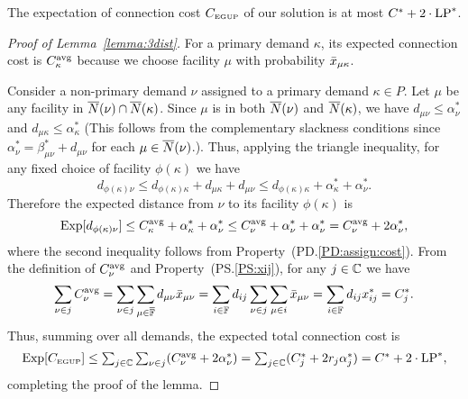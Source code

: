 \documentclass{llncs}
\begin{document}
\begin{lemma}\label{lemma:3dist}
The expectation of connection cost $C_{\mbox{\tiny\rm EGUP}}$ of our solution
is at most  $C^\ast+2\cdot\mbox{\rm LP}^\ast$.
\end{lemma}
\begin{proof}[Proof of Lemma~\ref{lemma:3dist}]
  For a primary demand $\kappa$, its expected connection cost is
  $C_{\kappa}^{{\mbox{\scriptsize\rm avg}}}$ because we choose facility $\mu$ with
  probability ${\bar x}_{\mu\kappa}$.

  Consider a non-primary demand $\nu$ assigned to a primary demand
  $\kappa\in P$. Let $\mu$ be any facility in ${\overline{N}}(\nu) \cap
  {\overline{N}}(\kappa)$.  Since $\mu$ is in both ${\overline{N}}(\nu)$ and
  ${\overline{N}}(\kappa)$, we have $d_{\mu\nu} \leq \alpha_{\nu}^\ast$ and
  $d_{\mu\kappa} \leq \alpha_{\kappa}^\ast$ (This follows from the
  complementary slackness conditions since
  $\alpha_{\nu}^\ast=\beta_{\mu\nu}^\ast + d_{\mu\nu}$ for each
  $\mu\in {\overline{N}}(\nu)$.). Thus, applying the triangle inequality, for
  any fixed choice of facility $\phi(\kappa)$ we have
%
\begin{equation*}
    d_{\phi(\kappa)\nu} \leq d_{\phi(\kappa)\kappa}+d_{\mu\kappa}+d_{\mu\nu}
    \leq d_{\phi(\kappa)\kappa} + \alpha_{\kappa}^\ast + \alpha_{\nu}^\ast.
\end{equation*}
%
Therefore the expected distance from $\nu$ to its facility $\phi(\kappa)$ is 
%
\begin{equation*}
  \mbox{\rm Exp}[  d_{\phi(\kappa)\nu}   ] \le C^{{\mbox{\scriptsize\rm avg}}}_{\kappa} + \alpha_{\kappa}^\ast + \alpha_{\nu}^\ast 
  \leq C^{{\mbox{\scriptsize\rm avg}}}_{\nu} + \alpha_{\nu}^\ast + \alpha_{\nu}^\ast
   = C^{{\mbox{\scriptsize\rm avg}}}_{\nu} + 2\alpha_{\nu}^\ast,
\end{equation*}
%
  where the second inequality follows from Property~(PD.\ref{PD:assign:cost}).  
From the definition of $C^{{\mbox{\scriptsize\rm avg}}}_{\nu}$ and Property~(PS.\ref{PS:xij}), for any $j\in \mathbb{C}$ 
we have
%
\begin{equation*}
\sum_{\nu\in j} C^{{\mbox{\scriptsize\rm avg}}}_{\nu} = \sum_{\nu\in j}\sum_{\mu\in\overline{\mathbb{F}}}d_{\mu\nu}{\bar x}_{\mu\nu}
 			= \sum_{i\in\mathbb{F}} d_{ij}\sum_{\nu\in j}\sum_{\mu\in i}{\bar x}_{\mu\nu}
			= \sum_{i\in\mathbb{F}} d_{ij}x^\ast_{ij} 
			= C^\ast_j.
\end{equation*}
% 
Thus, summing over all demands, the expected total connection cost is
%
\begin{equation*}
    \mbox{\rm Exp}[C_{\mbox{\tiny\rm EGUP}}] \le 
			\textstyle{\sum_{j\in\mathbb{C}} \sum_{\nu\in j}} (C^{{\mbox{\scriptsize\rm avg}}}_{\nu} + 2\alpha_{\nu}^\ast) 
    	= \textstyle{\sum_{j\in\mathbb{C}}} (C_j^\ast + 2r_j\alpha_j^\ast)
 		= C^\ast + 2\cdot\mbox{\rm LP}^\ast,
\end{equation*}
%
completing the proof of the lemma.
\end{proof}
\end{document}
